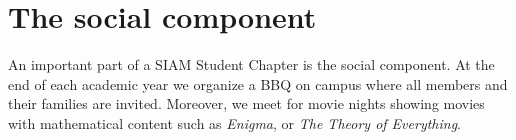 \documentclass{article}
\begin{document}
 \section*{The social component}
 An important part of a SIAM Student Chapter is the social component. At the end of each academic year we organize a BBQ on campus where all members and their families are invited. Moreover, we meet for movie nights showing movies with mathematical content such as \textit{Enigma}, or \textit{The Theory of Everything}. 
 
\end{document}
